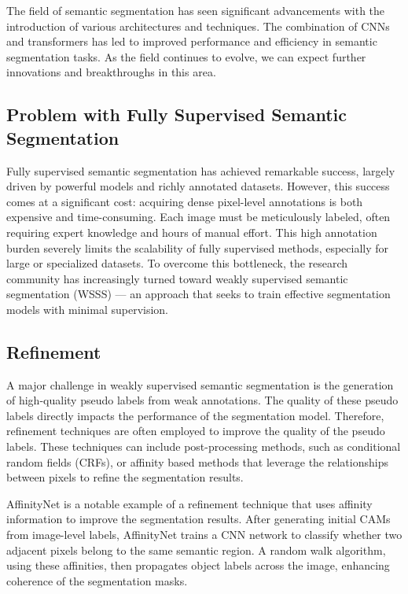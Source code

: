 The field of semantic segmentation has seen significant advancements with the introduction of various architectures and techniques. The combination of CNNs and transformers has led to improved performance and efficiency in semantic segmentation tasks. As the field continues to evolve, we can expect further innovations and breakthroughs in this area.

\subsection{Problem with Fully Supervised Semantic Segmentation}
\label{subsec:problem-with-fully-supervised}
Fully supervised semantic segmentation has achieved remarkable success, largely driven by powerful models and richly annotated datasets. However, this success comes at a significant cost: acquiring dense pixel-level annotations is both expensive and time-consuming. Each image must be meticulously labeled, often requiring expert knowledge and hours of manual effort. This high annotation burden severely limits the scalability of fully supervised methods, especially for large or specialized datasets. To overcome this bottleneck, the research community has increasingly turned toward weakly supervised semantic segmentation (WSSS) — an approach that seeks to train effective segmentation models with minimal supervision.






\subsection{Refinement}
\label{subsec:refinement}
A major challenge in weakly supervised semantic segmentation is the generation of high-quality pseudo labels from weak annotations. The quality of these pseudo labels directly impacts the performance of the segmentation model. Therefore, refinement techniques are often employed to improve the quality of the pseudo labels. These techniques can include post-processing methods, such as conditional random fields (CRFs), or affinity based methods that leverage the relationships between pixels to refine the segmentation results.

AffinityNet \cite{wsss_affinitynet} is a notable example of a refinement technique that uses affinity information to improve the segmentation results. After generating initial CAMs from image-level labels, AffinityNet trains a CNN network to classify whether two adjacent pixels belong to the same semantic region. A random walk algorithm, using these affinities, then propagates object labels across the image, enhancing coherence of the segmentation masks.

